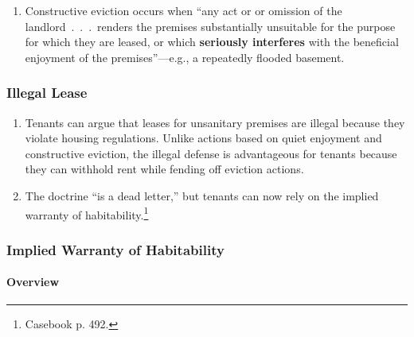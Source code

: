\begin{enumerate}
    \item Constructive eviction occurs when ``any act or or omission of the 
    landlord~.~.~.~renders the premises substantially unsuitable for the 
    purpose for which they are leased, or which \textbf{seriously interferes} 
    with the beneficial enjoyment of the premises''---e.g., a repeatedly 
    flooded basement.
\end{enumerate}

\subsubsection{Illegal Lease}

\begin{enumerate}
    \item Tenants can argue that leases for unsanitary premises are illegal 
    because they violate housing regulations. Unlike actions based on quiet 
    enjoyment and constructive eviction, the illegal defense is advantageous 
    for tenants because they can withhold rent while fending off eviction 
    actions.
    \item The doctrine ``is a dead letter,'' but tenants can now rely on the 
    implied warranty of habitability.\footnote{Casebook p. 492.}
\end{enumerate}

\subsubsection{Implied Warranty of Habitability}

\paragraph{Overview}


